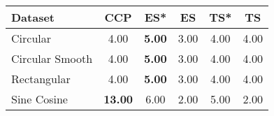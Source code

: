 \begin{tabular}{lccccc}
\toprule
Dataset & CCP & ES* & ES & TS* & TS \\
\midrule
Circular & 4.00 & \textbf{5.00} & 3.00 & 4.00 & 4.00 \\
Circular Smooth & 4.00 & \textbf{5.00} & 3.00 & 4.00 & 4.00 \\
Rectangular & 4.00 & \textbf{5.00} & 3.00 & 4.00 & 4.00 \\
Sine Cosine & \textbf{13.00} & 6.00 & 2.00 & 5.00 & 2.00 \\
\bottomrule
\end{tabular}